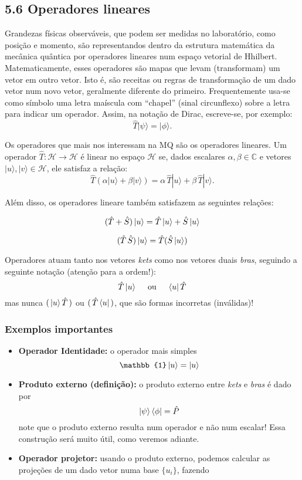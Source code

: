 \documentclass[11pt]{article}
\begin{document}
\hypertarget{operadores-lineares}{%
\subsection{5.6 Operadores lineares}\label{operadores-lineares}}

Grandezas físicas observáveis, que podem ser medidas no laboratório,
como posição e momento, são representandos dentro da estrutura
matemática da mecânica quântica por operadores lineares num espaço
vetorial de Hhilbert. Matematicamente, esses operadores são mapas que
levam (transformam) um vetor em outro vetor. Isto é, são receitas ou
regras de transformação de um dado vetor num novo vetor, geralmente
diferente do primeiro. Frequentemente usa-se como símbolo uma letra
maíscula com ``chapel'' (sinal circunflexo) sobre a letra para indicar
um operador. Assim, na notação de Dirac, escreve-se, por exemplo: \[
\hat{T}|\psi\rangle=|\phi \rangle.
\]

Os operadores que mais nos interessam na MQ são os operadores lineares.
Um operador \(\hat{T}:\mathcal{H}\rightarrow\mathcal{H}\) é linear no
espaço \(\mathcal{H}\) se, dados escalares
\(\alpha, \beta \in \mathbb{C}\) e vetores
\(|u\rangle, |v\rangle \in \mathcal{H}\), ele satisfaz a relação: \[
\hat{T}(\alpha|u\rangle+\beta|v\rangle)=\alpha\, \hat{T}|u\rangle+\beta\, \hat{T}|v\rangle.
\]

Além disso, os operadores lineare também satisfazem as seguintes
relações:

\[
(\hat{T}+\hat{S})\left| u \right\rangle=\hat{T}\left| u \right\rangle + \hat{S}\left| u \right\rangle
\]

\[ 
(\hat{T}\,\hat{S})\left| u \right\rangle=\hat{T}(\hat{S}\left| u \right\rangle)
\]

Operadores atuam tanto nos vetores \emph{kets} como nos vetores duais
\emph{bras}, seguindo a seguinte notação (atenção para a ordem!): \[ 
\hat{T}\left| u \right\rangle \quad \text{ ou } \quad \left\langle u \right| \hat{T}
\] mas nunca \((\,\left| u \right\rangle \hat{T}\,)\) ou \((\,\hat{T} \left\langle u \right|\,)\), que
são formas incorretas (inválidas)!

\hypertarget{exemplos-importantes}{%
\subsubsection{Exemplos importantes}\label{exemplos-importantes}}

\begin{itemize}
\item
  \textbf{Operador Identidade:} o operador mais simples \[
  \mathbb{1}\ket{u}=\ket{u}
  \]
\item
  \textbf{Produto externo (definição):} o produto externo entre
  \emph{kets} e \emph{bras} é dado por \[
  \left| \psi \right\rangle\left\langle \phi \right| = \hat{P}
  \] note que o produto externo resulta num operador e não num escalar!
  Essa construção será muito útil, como veremos adiante.
\item
  \textbf{Operador projetor:} usando o produto externo, podemos calcular
  as projeções de um dado vetor numa base \(\{ u_i \}\), fazendo
\end{itemize}
\end{document}
